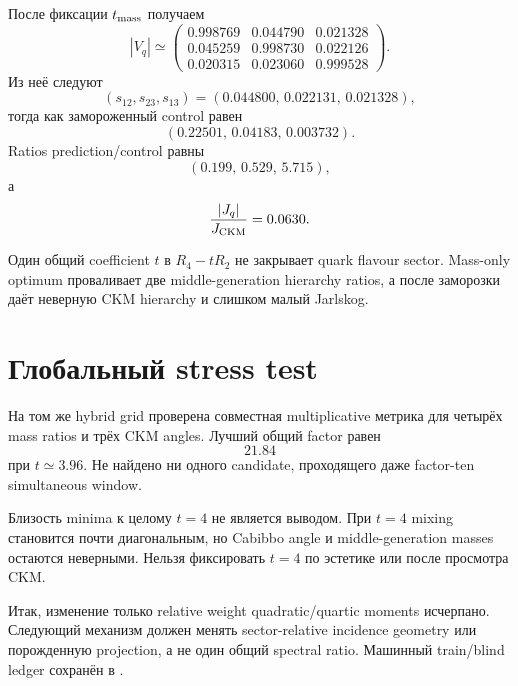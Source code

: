 После фиксации \(t_{\rm mass}\) получаем
\begin{equation}
 |V_q|\simeq
 \begin{pmatrix}
 0.998769&0.044790&0.021328\\
 0.045259&0.998730&0.022126\\
 0.020315&0.023060&0.999528
 \end{pmatrix}.
\end{equation}
Из неё следуют
\begin{equation}
 (s_{12},s_{23},s_{13})
 =(0.044800,\,0.022131,\,0.021328),
\end{equation}
тогда как замороженный control равен
\begin{equation}
 (0.22501,\,0.04183,\,0.003732).
\end{equation}
Ratios prediction/control равны
\begin{equation}
 (0.199,\,0.529,\,5.715),
\end{equation}
а
\begin{equation}
 \frac{|J_q|}{J_{\rm CKM}}=0.0630.
\end{equation}

\begin{theorem}
Один общий coefficient \(t\) в \(R_4-tR_2\) не закрывает quark flavour
sector. Mass-only optimum проваливает две middle-generation hierarchy ratios,
а после заморозки даёт неверную CKM hierarchy и слишком малый Jarlskog.
\end{theorem}

\section{Глобальный stress test}

На том же hybrid grid проверена совместная multiplicative метрика для четырёх
mass ratios и трёх CKM angles. Лучший общий factor равен
\begin{equation}
 21.84
\end{equation}
при \(t\simeq3.96\). Не найдено ни одного candidate, проходящего даже
factor-ten simultaneous window.

\begin{nogocriterion}[Запрет tuning к красивому \(t=4\)]
Близость minima к целому \(t=4\) не является выводом. При \(t=4\) mixing
становится почти диагональным, но Cabibbo angle и middle-generation masses
остаются неверными. Нельзя фиксировать \(t=4\) по эстетике или после просмотра
CKM.
\end{nogocriterion}

Итак, изменение только relative weight quadratic/quartic moments исчерпано.
Следующий механизм должен менять sector-relative incidence geometry или
порожденную projection, а не один общий spectral ratio. Машинный train/blind
ledger сохранён в
.